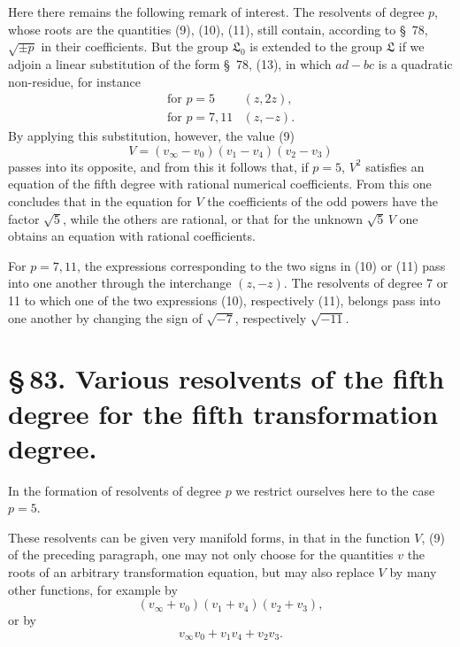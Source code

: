 \documentclass[11pt]{article}
\providecommand{\Lzero}{\mathfrak L_0}
\begin{document}
Here there remains the following remark of interest. The resolvents of degree $p$, whose roots are the quantities (9), (10), (11), still contain, according to \S~78, $\sqrt{\pm p}$ in their coefficients. But the group $\Lzero$ is extended to the group $\mathfrak L$ if we adjoin a linear substitution of the form \S~78, (13), in which $ad-bc$ is a quadratic non-residue, for instance
\[
 \begin{array}{ll}
 \text{for }p=5& (z,2z),\\[0.2em]
 \text{for }p=7,11& (z,-z).
 \end{array}
\]
By applying this substitution, however, the value (9)
\[
 V=(v_\infty-v_0)(v_1-v_4)(v_2-v_3)
\]
passes into its opposite, and from this it follows that, if $p=5$, $V^2$ satisfies an equation of the fifth degree with rational numerical coefficients. From this one concludes that in the equation for $V$ the coefficients of the odd powers have the factor $\sqrt5$, while the others are rational, or that for the unknown $\sqrt5\,V$ one obtains an equation with rational coefficients.

For $p=7,11$, the expressions corresponding to the two signs in (10) or (11) pass into one another through the interchange $(z,-z)$. The resolvents of degree 7 or 11 to which one of the two expressions (10), respectively (11), belongs pass into one another by changing the sign of $\sqrt{-7}$, respectively $\sqrt{-11}$.


\clearpage
\section*{\S\,83. Various resolvents of the fifth degree for the fifth transformation degree.}

In the formation of resolvents of degree \(p\) we restrict ourselves here to the case \(p=5\).

These resolvents can be given very manifold forms, in that in the function \(V\), (9) of the preceding paragraph, one may not only choose for the quantities \(v\) the roots of an arbitrary transformation equation, but may also replace \(V\) by many other functions, for example by
\[
 (v_\infty+v_0)(v_1+v_4)(v_2+v_3),
\]
or by
\[
 v_\infty v_0+v_1v_4+v_2v_3.
\]
\end{document}
